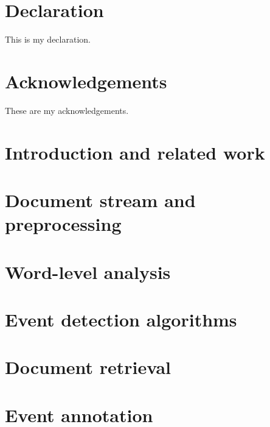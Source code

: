 \documentclass[12pt,twoside]{report}
\begin{document}






\chapter*{Declaration}
This is my declaration.


\chapter*{Acknowledgements}
These are my acknowledgements.


\tableofcontents
\listoffigures
\listofalgorithms


\chapter{Introduction and related work}


\chapter{Document stream and preprocessing}
\label{chap:data-preprocessing}


\chapter{Word-level analysis}
\label{chap:word-analysis}


\chapter{Event detection algorithms}
\label{chap:event-detection}


\chapter{Document retrieval}
\label{chap:document-retrieval}


\chapter{Event annotation}

\end{document}
